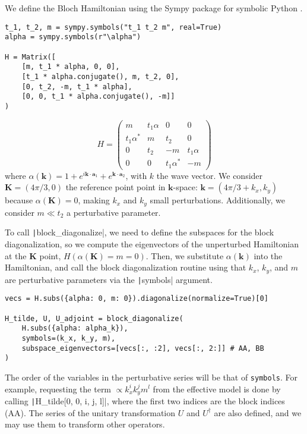 We define the Bloch Hamiltonian using the Sympy package for symbolic Python \cite{Meurer_2017}.
%
\begin{verbatim}
t_1, t_2, m = sympy.symbols("t_1 t_2 m", real=True)
alpha = sympy.symbols(r"\alpha")

H = Matrix([
    [m, t_1 * alpha, 0, 0],
    [t_1 * alpha.conjugate(), m, t_2, 0],
    [0, t_2, -m, t_1 * alpha],
    [0, 0, t_1 * alpha.conjugate(), -m]]
)
\end{verbatim}
%
$$
H =
\begin{pmatrix}
m & t_1 \alpha & 0 & 0\\
t_1 \alpha^{*} & m & t_2 & 0\\
0 & t_2 & -m & t_1 \alpha\\
0 & 0 & t_1 \alpha^{*} & -m
\end{pmatrix}
$$
%
where $\alpha(\mathbf{k}) = 1 + e^{i \mathbf{k} \cdot \mathbf{a}_1} + e^{\mathbf{k} \cdot \mathbf{a}_2}$, with $k$ the wave vector.
We consider $\mathbf{K}=(4\pi/3, 0)$ the reference point point in $\mathbf{k}$-space: $\mathbf{k} = (4\pi/3 + k_x, k_y)$ because $\alpha(\mathbf{K}) = 0$, making $k_x$ and $k_y$ small perturbations.
Additionally, we consider $m \ll t_2$ a perturbative parameter.

To call \texttt|block_diagonalize|, we need to define the subspaces for the block diagonalization, so we compute the eigenvectors of the unperturbed Hamiltonian at the $\mathbf{K}$ point, $H(\alpha(\mathbf{K}) = m = 0)$.
Then, we substitute $\alpha(\mathbf{k})$ into the Hamiltonian, and call the block diagonalization routine using that $k_x$, $k_y$, and $m$ are perturbative parameters via the \texttt|symbols| argument.
%
\begin{verbatim}
vecs = H.subs({alpha: 0, m: 0}).diagonalize(normalize=True)[0]

H_tilde, U, U_adjoint = block_diagonalize(
    H.subs({alpha: alpha_k}),
    symbols=(k_x, k_y, m),
    subspace_eigenvectors=[vecs[:, :2], vecs[:, 2:]] # AA, BB
)
\end{verbatim}
%
The order of the variables in the perturbative series will be that of \texttt{symbols}.
For example, requesting the term $\propto k_x^{i} k_y^{j} m^{l}$ from the effective model is done by calling \texttt|H_tilde[0, 0, i, j, l]|, where the first two indices are the block indices (AA).
The series of the unitary transformation $U$ and $U^\dagger$ are also defined, and we may use them to transform other operators.

